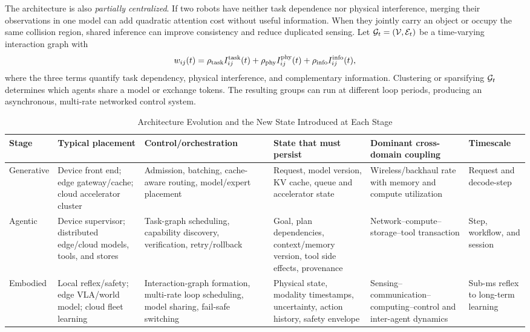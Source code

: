 \documentclass[letterpaper,journal]{IEEEtran}
\begin{document}
The architecture is also \emph{partially centralized}. If two robots have
neither task dependence nor physical interference, merging their observations
in one model can add quadratic attention cost without useful information.
When they jointly carry an object or occupy the same collision region,
shared inference can improve consistency and reduce duplicated sensing. Let
${\cal G}_t=({\cal V},{\cal E}_t)$ be a time-varying interaction graph with
\begin{equation}
w_{ij}(t)=\rho_{\rm task} I_{ij}^{\rm task}(t)
+\rho_{\rm phy} I_{ij}^{\rm phy}(t)
+\rho_{\rm info} I_{ij}^{\rm info}(t),
\label{eq:interaction}
\end{equation}
where the three terms quantify task dependency, physical interference, and
complementary information. Clustering or sparsifying ${\cal G}_t$ determines
which agents share a model or exchange tokens. The resulting groups can run
at different loop periods, producing an asynchronous, multi-rate networked
control system.

\begin{table}[t]
\caption{Architecture Evolution and the New State Introduced at Each Stage}
\label{tab:architecture}
\centering
\footnotesize
\renewcommand{\arraystretch}{1.18}
\setlength{\tabcolsep}{3pt}
\begin{tabular}{|p{}|p{}|p{}|p{}|p{}|p{}|}
\hline
\textbf{Stage} & \textbf{Typical placement} & \textbf{Control/orchestration}
& \textbf{State that must persist} & \textbf{Dominant cross-domain coupling}
& \textbf{Timescale} \\ \hline
Generative &
Device front end; edge gateway/cache; cloud accelerator cluster &
Admission, batching, cache-aware routing, model/expert placement &
Request, model version, KV cache, queue and accelerator state &
Wireless/backhaul rate with memory and compute utilization &
Request and decode-step \\ \hline
Agentic &
Device supervisor; distributed edge/cloud models, tools, and stores &
Task-graph scheduling, capability discovery, verification, retry/rollback &
Goal, plan dependencies, context/memory version, tool side effects,
provenance &
Network--compute--storage--tool transaction &
Step, workflow, and session \\ \hline
Embodied &
Local reflex/safety; edge VLA/world model; cloud fleet learning &
Interaction-graph formation, multi-rate loop scheduling, model sharing,
fail-safe switching &
Physical state, modality timestamps, uncertainty, action history, safety
envelope &
Sensing--communication--computing--control and inter-agent dynamics &
Sub-ms reflex to long-term learning \\ \hline
\end{tabular}
\end{table}
\end{document}
